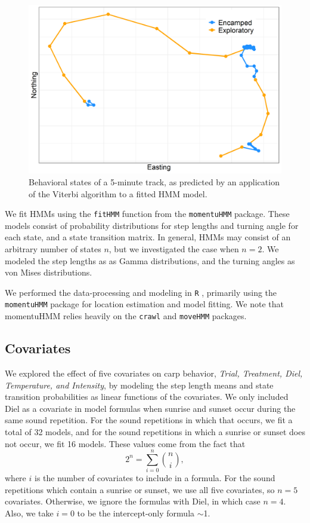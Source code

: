 \documentclass[12pt]{article}
\begin{document}
	\begin{figure}
		\includegraphics[width=\textwidth]{track_states.png}
		\caption{Behavioral states of a 5-minute track, as predicted by an application of the Viterbi algorithm to a fitted HMM model.}
		\label{img:track_states}
	\end{figure}
	
	We fit HMMs using the \texttt{fitHMM} function from the \texttt{momentuHMM} package. These models consist of probability distributions for step lengths and turning angle for each state, and a state transition matrix. In general, HMMs may consist of an arbitrary number of states $n$, but we investigated the case when $n = 2$. We modeled the step lengths as as Gamma distributions, and the turning angles as von Mises distributions.
	
	We performed the data-processing and modeling in \texttt{R} \cite{Rlang2022}, primarily using the \texttt{momentuHMM} package \cite{McClintock2018} for location estimation and model fitting. We note that momentuHMM relies heavily on the \texttt{crawl} \cite{crawl} and \texttt{moveHMM} \cite{Michelot2016} packages.
	
	\subsection{Covariates}
	
	We explored the effect of five covariates on carp behavior, \emph{Trial, Treatment, Diel, Temperature, and Intensity}, by modeling the step length means and state transition probabilities as linear functions of the covariates. We only included Diel as a covariate in model formulas when sunrise and sunset occur during the same sound repetition. For the sound repetitions in which that occurs, we fit a total of 32 models, and for the sound repetitions in which a sunrise or sunset does not occur, we fit 16 models. These values come from the fact that
	\[2^n = \sum_{i=0}^n {n \choose i},\]
	where $i$ is the number of covariates to include in a formula. For the sound repetitions which contain a sunrise or sunset, we use all five covariates, so $n = 5$ covariates. Otherwise, we ignore the formulas with Diel, in which case $n = 4$. Also, we take $i = 0$ to be the intercept-only formula $\sim$1.
	
\end{document}
